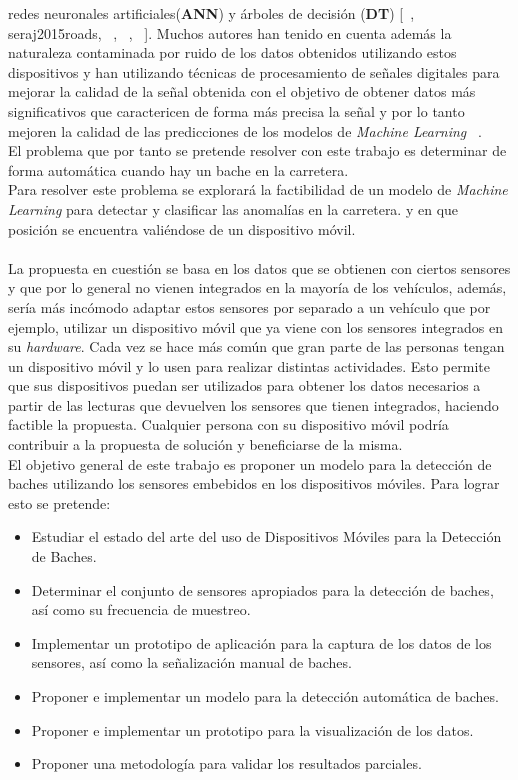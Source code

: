 redes neuronales artificiales(\textbf{ANN}) y árboles de decisión (\textbf{DT}) [~, ~\brackcite
{seraj2015roads}, ~, ~, ~]. Muchos
autores han tenido en cuenta además la naturaleza contaminada por ruido de los datos obtenidos utilizando estos dispositivos y han
utilizando técnicas de procesamiento de señales digitales para mejorar la calidad de la señal obtenida con el objetivo de obtener
datos más significativos que caractericen de forma más precisa la señal y por lo tanto mejoren la calidad de las predicciones de
los modelos de \emph{Machine Learning} ~.\\
\indent El problema que por tanto se pretende resolver con este trabajo es determinar de forma automática cuando hay un bache
en la carretera.\\ 
\indent Para resolver este problema se explorará la factibilidad de un modelo de \emph{Machine Learning} para detectar y clasificar
las anomalías en la carretera. y en que posición se encuentra valiéndose de un dispositivo móvil.\\\\
\indent La propuesta en cuestión se basa en los datos que se obtienen con ciertos sensores y que por lo general no vienen integrados
en la mayoría de los vehículos, además, sería más incómodo adaptar estos sensores por separado a un vehículo que por ejemplo, utilizar
un dispositivo móvil que ya viene con los sensores integrados en su \emph{hardware}. Cada vez se hace más común que gran parte de 
las personas tengan un dispositivo móvil y lo usen para realizar distintas actividades. Esto permite que sus dispositivos puedan ser utilizados
para obtener los datos necesarios a partir de las lecturas que devuelven los sensores que tienen integrados, haciendo factible la propuesta. 
Cualquier persona con su dispositivo móvil podría contribuir a la propuesta de solución y beneficiarse de la misma.\\
\indent El objetivo general de este trabajo es proponer un modelo para la detección de baches utilizando los sensores embebidos en los
dispositivos móviles. Para lograr esto se pretende:

\begin{itemize}
	\item Estudiar el estado del arte del uso de Dispositivos Móviles para la Detección de Baches.
	\item Determinar el conjunto de sensores apropiados para la detección de baches, así como su frecuencia de muestreo.
	\item Implementar un prototipo de aplicación para la captura de los datos de los sensores, así como la señalización
		manual de baches.
	\item Proponer e implementar un modelo para la detección automática de baches.
	\item Proponer e implementar un prototipo para la visualización de los datos.
	\item Proponer una metodología para validar los resultados parciales.
\end{itemize}
